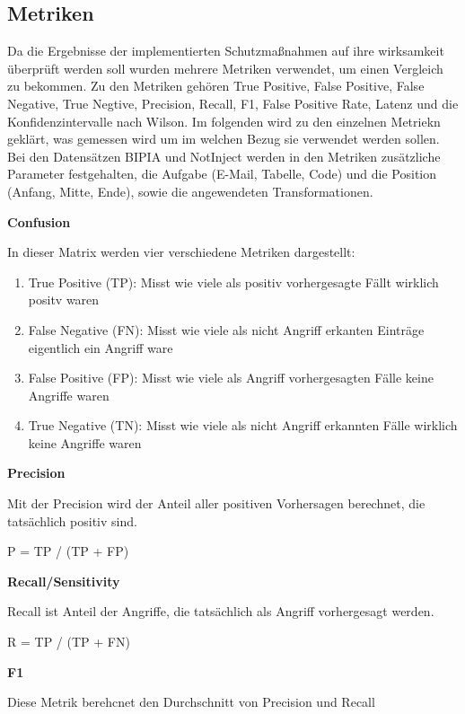 \subsection{Metriken}\label{subsec:metrics}

Da die Ergebnisse der implementierten Schutzmaßnahmen auf ihre wirksamkeit überprüft werden soll wurden mehrere Metriken verwendet, um einen Vergleich zu bekommen.
Zu den Metriken gehören True Positive, False Positive, False Negative, True Negtive, Precision, Recall, F1, False Positive Rate, Latenz und die Konfidenzintervalle
nach Wilson. Im folgenden 
wird zu den einzelnen Metriekn geklärt, was gemessen wird um im welchen Bezug sie verwendet werden sollen. Bei den Datensätzen BIPIA und NotInject werden in den 
Metriken zusätzliche Parameter festgehalten, die Aufgabe (E-Mail, Tabelle, Code) und die Position (Anfang, Mitte, Ende), sowie die angewendeten Transformationen.

\textbf{Confusion}~\cite[75]{sm28}

In dieser Matrix werden vier verschiedene Metriken dargestellt: \\

\begin{enumerate}
    \item True Positive (TP): Misst wie viele als positiv vorhergesagte Fällt wirklich positv waren
    \item False Negative (FN): Misst wie viele als nicht Angriff erkanten Einträge eigentlich ein Angriff ware
    \item False Positive (FP): Misst wie viele als Angriff vorhergesagten Fälle keine Angriffe waren
    \item True Negative (TN): Misst wie viele als nicht Angriff erkannten Fälle wirklich keine Angriffe waren
\end{enumerate}

\textbf{Precision}~\cite[227]{sm29}

Mit der Precision wird der Anteil aller positiven Vorhersagen berechnet, die tatsächlich positiv sind.

P = TP / (TP + FP)

\textbf{Recall/Sensitivity}~\cite[227]{sm29}

Recall ist Anteil der Angriffe, die tatsächlich als Angriff vorhergesagt werden. 

R = TP / (TP + FN)

\textbf{F1}~\cite[227]{sm29}

Diese Metrik berehcnet den Durchschnitt von Precision und Recall 

